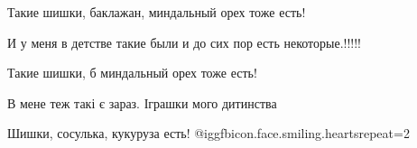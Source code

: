  
 
 
 
 
Такие шишки, баклажан, миндальный орех тоже есть!

И у меня в детстве такие были и до сих пор есть некоторые.!!!!!

Такие шишки, б
миндальный орех тоже есть!

В мене теж такі є зараз. Іграшки мого дитинства

Шишки, сосулька, кукуруза есть!  @igg{fbicon.face.smiling.hearts}{repeat=2} 
